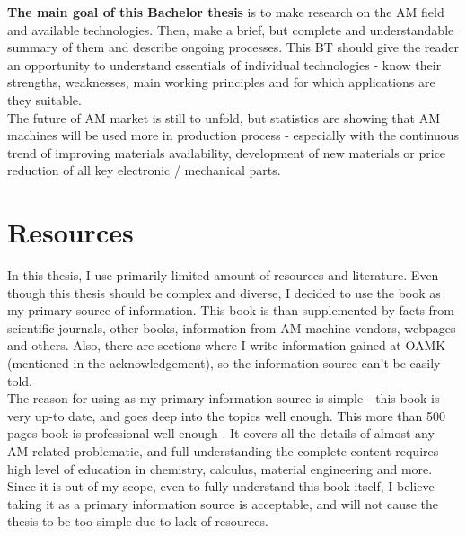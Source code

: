 \documentclass[a4paper, twoside, 11pt]{report}
\begin{document}
\textbf{The main goal of this Bachelor thesis} is to make research on the AM field and available technologies. Then, make a brief, but complete and understandable summary of them and describe ongoing processes. This BT should give the reader an opportunity to understand essentials of individual technologies - know their strengths, weaknesses, main working principles and for which applications are they suitable.\\
The future of AM market is still to unfold, but statistics are showing that AM machines will be used more in production process - especially with the continuous trend of improving materials availability, development of new materials or price reduction of all key electronic / mechanical parts. \newpage
%
\section{Resources}
In this thesis, I use primarily limited amount of resources and literature. Even though this thesis should be complex and diverse, I decided to use the book \cite{AMT} as my primary source of information. This book is than supplemented by facts from scientific journals, other books, information from AM machine vendors, webpages and others. Also, there are sections where I write information gained at OAMK (mentioned in the acknowledgement), so the information source can't be easily told.\\
The reason for using \cite{AMT} as my primary information source is simple - this book is very up-to date, and goes deep into the topics well enough. This more than 500 pages book is professional well enough . It covers all the details of almost any AM-related problematic, and full understanding the complete content requires high level of education in chemistry, calculus, material engineering and more. Since it is out of my scope, even to fully understand this book itself, I believe taking it as a primary information source is acceptable, and will not cause the thesis to be too simple due to lack of resources.
%
\end{document}
